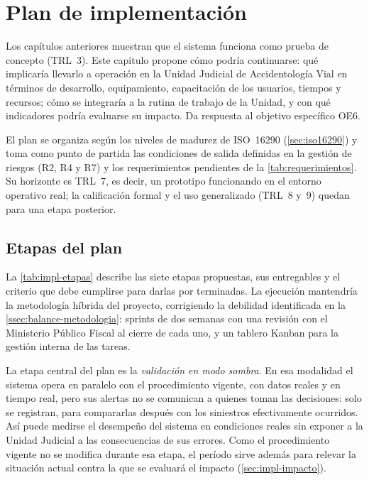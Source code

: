 
\chapter{Plan de implementación}\label{cap:implementacion}

Los capítulos anteriores muestran que el sistema funciona como prueba de concepto
(TRL~3). Este capítulo propone cómo podría continuarse: qué implicaría llevarlo a
operación en la Unidad Judicial de Accidentología Vial en términos de desarrollo,
equipamiento, capacitación de los usuarios, tiempos y recursos; cómo se integraría a la
rutina de trabajo de la Unidad, y con qué indicadores podría evaluarse su impacto. Da
respuesta al objetivo específico OE6.

El plan se organiza según los niveles de madurez de ISO~16290 (\cref{sec:iso16290}) y
toma como punto de partida las condiciones de salida definidas en la gestión de riesgos
(R2, R4 y R7) y los requerimientos pendientes de la \cref{tab:requerimientos}. Su
horizonte es TRL~7, es decir, un prototipo funcionando en el entorno operativo real; la
calificación formal y el uso generalizado (TRL~8 y~9) quedan para una etapa posterior.

\section{Etapas del plan}\label{sec:impl-etapas}

La \cref{tab:impl-etapas} describe las siete etapas propuestas, sus entregables y el
criterio que debe cumplirse para darlas por terminadas. La ejecución mantendría la
metodología híbrida del proyecto, corrigiendo la debilidad identificada en la
\cref{ssec:balance-metodologia}: sprints de dos semanas con una revisión con el
Ministerio Público Fiscal al cierre de cada uno, y un tablero Kanban para la gestión
interna de las tareas.

La etapa central del plan es la \emph{validación en modo sombra}. En esa modalidad el
sistema opera en paralelo con el procedimiento vigente, con datos reales y en tiempo
real, pero sus alertas no se comunican a quienes toman las decisiones: solo se
registran, para compararlas después con los siniestros efectivamente ocurridos. Así
puede medirse el desempeño del sistema en condiciones reales sin exponer a la Unidad
Judicial a las consecuencias de sus errores. Como el procedimiento vigente no se
modifica durante esa etapa, el período sirve además para relevar la situación actual
contra la que se evaluará el impacto (\cref{sec:impl-impacto}).

